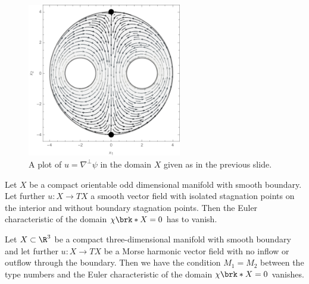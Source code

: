 \begin{frame}
  \begin{figure}
    \centering
    \includegraphics[width=0.6\textwidth]{../Plots/n2_hvf_roundRegion_InflowOutflow_gray_2.pdf}
    \caption{A plot of $u=\nabla^\perp\psi$ in the domain $X$ given as in the previous slide.}
    \label{pl:n2_hvf_noInflowNoOutflow}
  \end{figure}
\end{frame}


\begin{frame}
  \begin{proposition}\label{pr:n3_domainCond}
    Let $X$ be a compact orientable odd dimensional manifold with smooth boundary.
    Let further $u\colon X\to TX$ a smooth vector field with isolated stagnation points on the interior and without
    boundary stagnation points. Then the Euler characteristic of the domain $\chi\brk*{X}=0$ has to vanish.
  \end{proposition} 
\end{frame}

\begin{frame}
  \begin{corollary}\label{co:n3_conditionTypeNbrII}
    Let $X\subset\R^3$ be a compact three-dimensional manifold with smooth boundary and let further
    $u\colon X\to TX$ be a Morse harmonic vector field with no
    inflow or outflow through the boundary. Then
    we have the condition $M_1=M_2$ between the type numbers and the Euler characteristic of the domain $\chi\brk*{X}=0$ vanishes.
  \end{corollary}
\end{frame}

